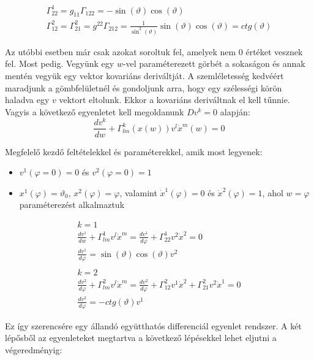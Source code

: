 \documentclass[a4paper,12pt]{article}
\begin{document}
\begin{align*}
    \Gamma_{22}^{1} = g_{11}\Gamma_{122} = -\sin(\vartheta)\cos(\vartheta) \\
    \Gamma_{12}^{2} = \Gamma_{21}^{2} = g^{22}\Gamma_{212} = \frac{1}{\sin^{2}(\vartheta)}\sin(\vartheta)\cos(\vartheta) = ctg(\vartheta)
\end{align*}
\par Az utóbbi esetben már csak azokat soroltuk fel, amelyek nem 0 értéket vesznek fel. Most pedig. Vegyünk egy $w$-vel paraméterezett görbét a sokaságon és annak mentén vegyük egy vektor kovariáns deriváltját. A szemléletesség kedvéért maradjunk a gömbfelületnél és gondoljunk arra, hogy egy szélességi körön haladva egy $v$ vektort eltolunk. Ekkor a kovariáns deriváltnak el kell tűnnie. Vagyis a következő egyenletet kell megoldanunk $Dv^{k} = 0$ alapján:
\begin{equation*}
    \frac{dv^{k}}{dw} + \Gamma_{lm}^{k}(x(w))v^{l}\dot{x}^{m}(w) = 0    
\end{equation*}
\par Megfelelő kezdő feltételekkel és paraméterekkel, amik most legyenek:
\begin{itemize}
    \item $v^{1}(\varphi = 0) = 0$ és $v^{2}(\varphi = 0) = 1$
    \item $x^{1}(\varphi) = \vartheta_{0}$, $x^{2}(\varphi) = \varphi$, valamint $\dot{x}^{1}(\varphi) = 0$ és $\dot{x}^{2}(\varphi) = 1$, ahol $w = \varphi$ paraméterezést alkalmaztuk
\end{itemize}
\begin{gather*}
    k = 1 \\
    \frac{dv^{1}}{dw} + \Gamma_{lm}^{1}v^{l}\dot{x}^{m} = \frac{dv^{1}}{d\varphi} + \Gamma_{22}^{1}v^{2}\dot{x}^{2} = 0 \\
    \frac{dv^{1}}{d\varphi} = \sin(\vartheta)\cos(\vartheta)v^{2} \\ \\
    k = 2 \\
    \frac{dv^{2}}{d\varphi} + \Gamma_{lm}^{2}v^{l}\dot{x}^{m} = \frac{dv^{2}}{d\varphi} + \Gamma_{12}^{2}v^{1}\dot{x}^{2} + \Gamma_{21}^{2}v^{2}\dot{x}^{1} = 0 \\
    \frac{dv^{2}}{d\varphi} = -ctg(\vartheta)v^{1}
\end{gather*}
\par Ez így szerencsére egy állandó együtthatós differenciál egyenlet rendszer. A két lépősből az egyenleteket megtartva a következő lépésekkel lehet eljutni a végeredményig:
\end{document}
